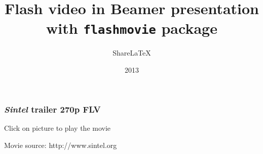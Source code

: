 \documentclass{beamer}
\title{Flash video in Beamer presentation\\with \texttt{flashmovie} package}
\author{Share\LaTeX}
\date{2013}
\begin{document}
\frame{\maketitle}


\begin{frame}
\frametitle{\textit{Sintel} trailer 270p FLV}

\begin{center}

Click on picture to play the movie
\end{center}

Movie source: http://www.sintel.org
\end{frame}
\end{document}
